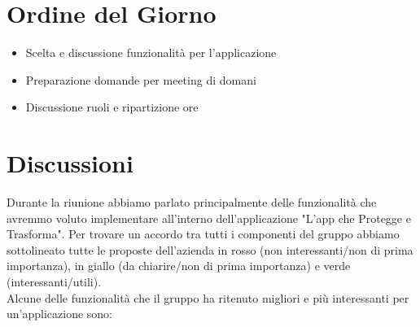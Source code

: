 \documentclass[a4paper,12pt]{article}
\begin{document}
\section{Ordine del Giorno}
\begin{itemize}
    \item Scelta e discussione funzionalità per l'applicazione
    \item Preparazione domande per meeting di domani
    \item Discussione ruoli e ripartizione ore
\end{itemize}

\section{Discussioni}
Durante la riunione abbiamo parlato principalmente delle funzionalità che avremmo voluto implementare all'interno dell'applicazione "L'app che Protegge e Trasforma".
Per trovare un accordo tra tutti i componenti del gruppo abbiamo sottolineato tutte le proposte dell'azienda in rosso (non interessanti/non di prima importanza), in giallo (da chiarire/non di prima importanza) e verde (interessanti/utili).\\
Alcune delle funzionalità che il gruppo ha ritenuto migliori e più interessanti per un'applicazione sono:
\end{document}
